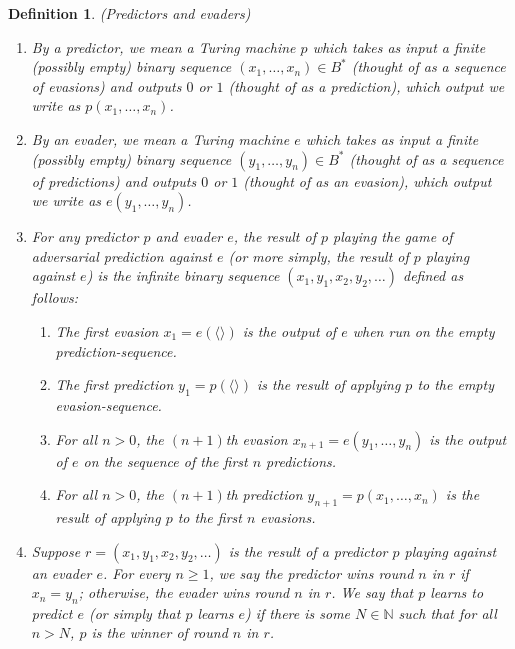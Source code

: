 \documentclass{article}
\newtheorem{definition}[theorem]{Definition}
\begin{document}
\begin{definition}
\label{evaderpredictordefn}
    (Predictors and evaders)
    \begin{enumerate}
        \item
        By a \emph{predictor}, we mean a Turing machine $p$
        which takes as input a finite (possibly empty) binary sequence
        $(x_1,\ldots,x_n)\in B^*$
        (thought of as a sequence of \emph{evasions})
        and outputs $0$ or $1$ (thought of as a \emph{prediction}), which output
        we write as $p(x_1,\ldots,x_n)$.
        \item
        By an \emph{evader}, we mean a Turing machine $e$
        which takes as input a finite (possibly empty) binary sequence
        $(y_1,\ldots,y_n)\in B^*$
        (thought of as a sequence of \emph{predictions})
        and outputs $0$ or $1$ (thought of as an \emph{evasion}), which output
        we write as $e(y_1,\ldots,y_n)$.
        \item
        For any predictor $p$ and evader $e$, the \emph{result of $p$ playing the
        game of adversarial prediction against $e$} (or more simply, the \emph{result of
        $p$ playing against $e$}) is the infinite binary sequence
        $(x_1,y_1,x_2,y_2,\ldots)$
        defined as follows:
        \begin{enumerate}
            \item
            The first evasion
            $x_1=e(\langle\rangle)$ is
            the output of $e$ when run on the empty prediction-sequence.
            \item
            The first prediction
            $y_1=p(\langle\rangle)$ is
            the result of applying $p$ to the empty evasion-sequence.
            \item
            For all $n>0$, the $(n+1)$th evasion
            $x_{n+1}=e(y_1,\ldots,y_n)$ is
            the output of $e$ on the sequence of the first $n$ predictions.
            \item
            For all $n>0$, the $(n+1)$th prediction
            $y_{n+1}=p(x_1,\ldots,x_n)$ is
            the result of applying $p$ to the first $n$ evasions.
        \end{enumerate}
        \item
        Suppose $r=(x_1,y_1,x_2,y_2,\ldots)$ is the result of a predictor $p$ playing
        against an evader $e$. For every $n\geq 1$,
        we say \emph{the predictor wins round $n$ in $r$}
        if $x_n=y_n$; otherwise,
        \emph{the evader wins round $n$ in $r$}.
        We say that \emph{$p$ learns to predict $e$}
        (or simply that \emph{$p$ learns $e$}) if there is some $N\in\mathbb N$
        such that for all $n>N$, $p$ is the winner of round $n$ in $r$.
    \end{enumerate}
\end{definition}
\end{document}
